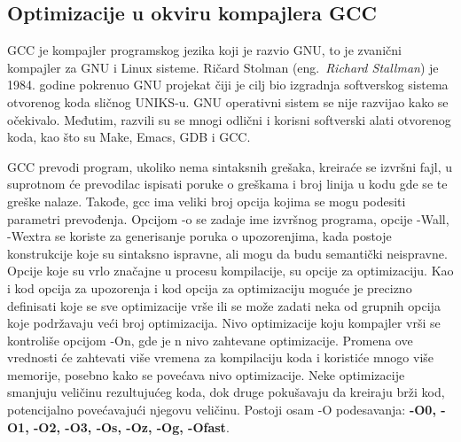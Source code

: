 \documentclass[a4paper]{article}
\begin{document}
\subsection{Optimizacije u okviru kompajlera GCC}
\label{subsec:optimizacijeGCC}

GCC je kompajler programskog jezika koji je razvio GNU, to je zvanični kompajler za GNU i Linux sisteme. Ričard Stolman (eng.~{\em Richard Stallman}) je 1984. godine pokrenuo GNU projekat čiji je cilj bio izgra\-dnja softverskog sistema otvorenog koda sličnog UNIKS-u. GNU operativni sistem se nije razvijao kako se očekivalo. Međutim, razvili su se mnogi odlični i korisni softverski alati otvorenog koda, kao što su Make, Emacs, GDB i GCC. \cite{gccVsClang}

GCC prevodi program, ukoliko nema sintaksnih grešaka, kreiraće se izvršni fajl, u suprotnom će prevodilac ispisati poruke o greškama i broj linija u kodu gde se te greške nalaze. Takođe, gcc ima veliki broj opcija kojima se mogu podesiti parametri prevođenja. Opcijom -o se zadaje ime izvršnog programa, opcije -Wall, -Wextra se koriste za generisanje poruka o upozorenjima, kada postoje konstrukcije koje su sintaksno ispravne, ali mogu da budu semantički neispravne. Opcije koje su vrlo značajne u procesu kompilacije, su opcije za optimizaciju. Kao i kod opcija za upozorenja i kod opcija za optimizaciju moguće je precizno definisati koje se sve optimizacije vrše ili se može zadati neka od grupnih opcija koje podržavaju veći broj optimizacija. Nivo optimizacije koju kompajler vrši se kontroliše opcijom -On, gde je n nivo zahtevane optimizacije. Promena ove vrednosti će zahtevati više vremena za kompilaciju koda i koristiće mnogo više memorije, posebno kako se povećava nivo optimizacije. \cite{gnuSamardzic} Neke optimizacije smanjuju veličinu rezultujućeg koda, dok druge pokušavaju da kreiraju brži kod, potencijalno povećavajući njegovu veličinu. Postoji osam -O podesavanja: \textbf{-O0, -O1, -O2, -O3, -Os, -Oz, -Og, -Ofast}.
\end{document}
